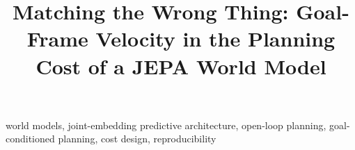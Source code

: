 \documentclass[conference]{IEEEtran}
\begin{document}
\title{Matching the Wrong Thing: Goal-Frame Velocity in the Planning Cost of a JEPA World Model}
\author{
}
\maketitle

\begin{abstract}

\end{abstract}

\begin{IEEEkeywords}
world models, joint-embedding predictive architecture, open-loop planning, goal-conditioned planning, cost
design, reproducibility
\end{IEEEkeywords}




\end{document}
